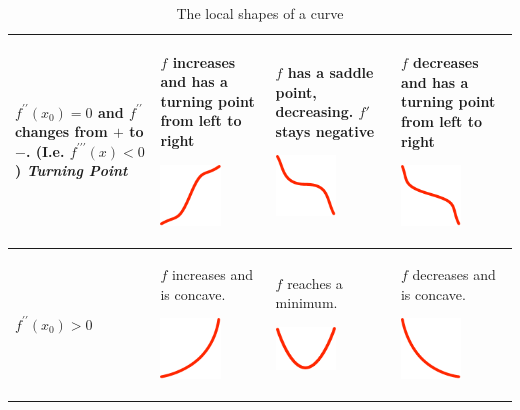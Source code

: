 \begin{table}
{\begin{center}
\begin{tabular}{p{17mm}|p{25mm}|p{25mm}|p{25mm}}
\hline
\begin{raggedright}%
$f^{\prime\prime}(x_0)=0$
{\footnotesize 
and $f^{\prime\prime}$ changes from $+$ to $-$. (I.e.
$f^{\prime\prime\prime}(x)<0$)}
{\em Turning Point}
\end{raggedright}&
\begin{raggedright}
$f$ increases and has a turning point
from left to right
\centerline{\includegraphics[width=16mm]{pic/CUR.pdf}}
\end{raggedright}&%
\begin{raggedright}
$f$ has a saddle point, decreasing.
$f'$ stays negative
\centerline{\includegraphics[width=16mm]{pic/CSD.pdf}}
\end{raggedright}&%
\begin{raggedright}
$f$ decreases and has a turning point
from left to right
\centerline{\includegraphics[width=16mm]{pic/CDR.pdf}}
\end{raggedright}\\

\hline
$f^{\prime\prime}(x_0)>0$&
\begin{raggedright}
$f$ increases and is concave.
\centerline{\includegraphics[width=16mm]{pic/CBR.pdf}}
\end{raggedright}&%
\begin{raggedright}
$f$ reaches a minimum.
\centerline{\includegraphics[width=16mm]{pic/CMI.pdf}}
\end{raggedright}&%
\begin{raggedright}
$f$ decreases and is concave.
\centerline{\includegraphics[width=16mm]{pic/CBL.pdf}}
\end{raggedright}
\\

\end{tabular}
\end{center}
}
\caption{The local shapes of a curve}
\label{tabkurdi}
\end{table}

